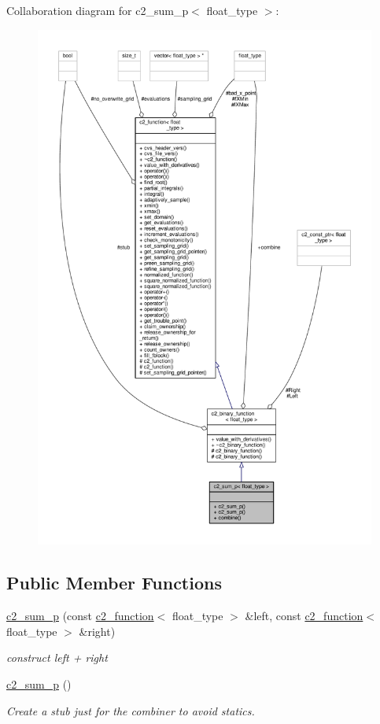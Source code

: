 Collaboration diagram for c2\+\_\+sum\+\_\+p$<$ float\+\_\+type $>$\+:
\nopagebreak
\begin{figure}[H]
\begin{center}
\leavevmode
\includegraphics[width=350pt]{classc2__sum__p__coll__graph}
\end{center}
\end{figure}
\subsection*{Public Member Functions}
\begin{DoxyCompactItemize}
\item 
\hyperlink{classc2__sum__p_ae42d9b2095cb521b23e19f1467d5e61d}{c2\+\_\+sum\+\_\+p} (const \hyperlink{classc2__function}{c2\+\_\+function}$<$ float\+\_\+type $>$ \&left, const \hyperlink{classc2__function}{c2\+\_\+function}$<$ float\+\_\+type $>$ \&right)
\begin{DoxyCompactList}\small\item\em construct {\itshape left} + {\itshape right} \end{DoxyCompactList}\item 
\hyperlink{classc2__sum__p_a434a01eaefb0481af72f9ef39b9b812f}{c2\+\_\+sum\+\_\+p} ()
\begin{DoxyCompactList}\small\item\em Create a stub just for the combiner to avoid statics. \end{DoxyCompactList}\end{DoxyCompactItemize}

